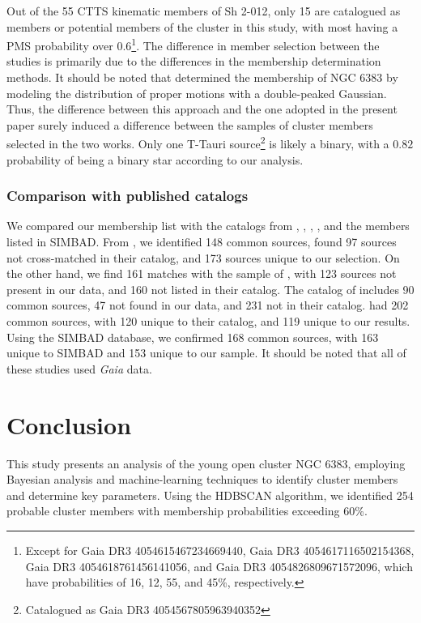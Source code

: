 \documentclass{aa}
\begin{document}
Out of the 55 CTTS kinematic members of Sh 2-012, only 15 are catalogued as members or potential members of the cluster in this study, with most having a PMS probability over $0.6$\footnote{Except for Gaia DR3 4054615467234669440, Gaia DR3 4054617116502154368, Gaia DR3 4054618761456141056, and Gaia DR3 4054826809671572096, which have probabilities of 16, 12, 55, and 45\%, respectively.}. The difference in member selection between the studies is primarily due to the differences in the membership determination methods. It should be noted that \citet{2019MNRAS.484.5102K} determined the membership of NGC 6383 by modeling the distribution of proper motions with a double-peaked Gaussian. Thus, the difference between this approach and the one adopted in the present paper surely induced a difference between the samples of cluster members selected in the two works. Only one T-Tauri source\footnote{Catalogued as Gaia DR3 4054567805963940352} is likely a binary, with a $0.82$ probability of being a binary star according to our analysis.

\subsubsection{Comparison with published catalogs}
We compared our membership list with the catalogs from \citet{2020AA...640A...1C}, \citet{2021ApJ...923..129J}, \citet{2022ApJS..262....7H}, \citet{2024arXiv240305143H}, and the members listed in SIMBAD. From \citet{2020AA...640A...1C}, we identified 148 common sources, found 97 sources not cross-matched in their catalog, and 173 sources unique to our selection. On the other hand, we find 161 matches with the sample of \citet{2021ApJ...923..129J}, with 123 sources not present in our data, and 160 not listed in their catalog. The catalog of \citet{2022ApJS..262....7H} includes 90 common sources, 47 not found in our data, and 231 not in their catalog. \citet{2024arXiv240305143H} had 202 common sources, with 120 unique to their catalog, and 119 unique to our results. Using the SIMBAD database, we confirmed 168 common sources, with 163 unique to SIMBAD and 153 unique to our sample. It should be noted that all of these studies used \textit{Gaia} data.

\section{Conclusion}\label{sec:conclusion}

This study presents an analysis of the young open cluster NGC 6383, employing Bayesian analysis and machine-learning techniques to identify cluster members and determine key parameters. Using the HDBSCAN algorithm, we identified 254 probable cluster members with membership probabilities exceeding 60\%.
\end{document}
